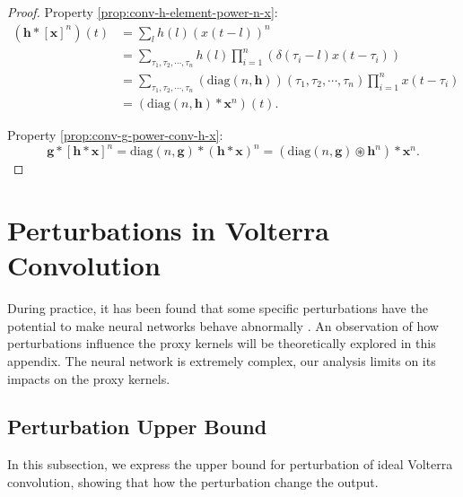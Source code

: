 \documentclass[twoside,11pt]{article}
\def\oconv{\circledast}
\def\diag{\text{diag}}
\def\tvar#1{\mathbf{#1}} %
\begin{document}
\begin{proof}
  Property \ref{prop:conv-h-element-power-n-x}:
  \begin{equation*}
    \begin{aligned}
      \left( \tvar{h} * [\tvar{x}]^n \right)(t)
       & = \sum_{l} h(l) \left( x(t - l) \right)^n                                                                    \\
       & = \sum_{\tau_1, \tau_2, \cdots, \tau_n} h(l) \prod_{i=1}^{n} \left( \delta(\tau_i - l) x(t - \tau_i) \right) \\
       & = \sum_{\tau_1, \tau_2, \cdots, \tau_n}
      \left( \diag(n, \tvar{h}) \right)(\tau_1, \tau_2, \cdots, \tau_n)
      \prod_{i=1}^{n} x(t - \tau_i)                                                                                   \\
       & = \left(\diag(n, \tvar{h}) * \tvar{x}^n\right)(t).
    \end{aligned}
  \end{equation*}

  Property \ref{prop:conv-g-power-conv-h-x}:
  \begin{equation*}
    \tvar{g} * [\tvar{h} * \tvar{x}]^n
    = \diag(n, \tvar{g}) * (\tvar{h} * \tvar{x})^n
    = (\diag(n, \tvar{g}) \oconv \tvar{h}^n) * \tvar{x}^n.
  \end{equation*}
\end{proof}


\section{Perturbations in Volterra Convolution}
\label{appendix:perturbations-in-vconv}

During practice, it has been found that some specific perturbations have the potential to make neural networks behave abnormally \citep{Szegedy2013,Goodfellow2014}.
An observation of how perturbations influence the proxy kernels will be theoretically explored in this appendix.
The neural network is extremely complex, our analysis limits on its impacts on the proxy kernels.


\subsection{Perturbation Upper Bound}
\label{subsec:perturbation-upper-bound}

In this subsection, we express the upper bound for perturbation of ideal Volterra convolution, showing that how the perturbation  change the output.
\end{document}
